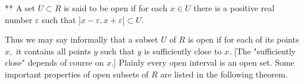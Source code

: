 ** A set $U \subset R$ is said to be open if for each $x \in U$ there is a positive real number $\varepsilon$ such that $]x - \varepsilon, x + \varepsilon[ \subset U.$

Thus we may say informally that a subset $U$ of $R$ is open if for each of its points $x,$ it contains all points $y$ such that $y$ is sufficiently close to $x.$ [The "sufficiently close" depends of course on $x.$] Plainly every open interval is an open set. Some important properties of open subsets of $R$ are listed in the following theorem.